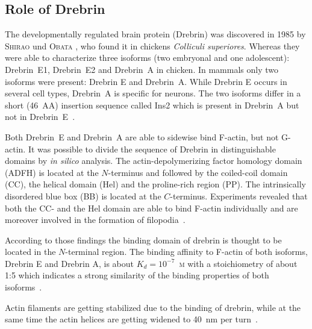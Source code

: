 \documentclass[a4paper,11pt,bibtotocnumbered]{article}
\begin{document}
 

\subsection{Role of Drebrin}


The developmentally regulated brain protein (Drebrin) was discovered in 1985 by \textsc{Shirao} und \textsc{Obata} \cite{Shirao1985}, who found it in chickens \textit{Colliculi superiores}. Whereas they were able to characterize three isoforms (two embryonal and one adolescent): Drebrin~E1, Drebrin~E2 and Drebrin~A in chicken. In mammals only two isoforms were present: Drebrin E and Drebrin~A. While Drebrin E occurs in several cell types, Drebrin~A is specific for neurons. The two isoforms differ in a short (46~AA) insertion sequence called Ins2 which is present in Drebrin~A but not in Drebrin~E~\cite{Shirao2017}.


Both Drebrin~E and Drebrin~A are able to sidewise bind F-actin, but not G-actin. It was possible to divide the sequence of Drebrin in distinguishable domains by \textit{in silico} analysis. The actin-depolymerizing factor homology domain (ADFH) is located at the $N$-terminus and followed by the coiled-coil domain (CC), the helical domain (Hel) and the proline-rich region (PP). The intrinsically disordered blue box (BB) is located at the $C$-terminus.  
Experiments revealed that both the CC- and the Hel domain are able to bind F-actin individually and are moreover involved in the formation of filopodia~\cite{Worth2013}. 

According to those findings the binding domain of drebrin is thought to be located in the $N$-terminal region. The binding affinity to F-actin of both isoforms, Drebrin E and Drebrin A, is about $K_d=10^{-7}$~\textsc{m} with a stoichiometry of about 1:5 which indicates a strong similarity of the binding properties of both isoforms~\cite{Shirao2017}.   


Actin filaments are getting stabilized due to the binding of drebrin, while at the same time the actin helices are getting widened to 40~nm per turn~\cite{Shirao2017}.   

\vspace{.75cm}


\end{document}
